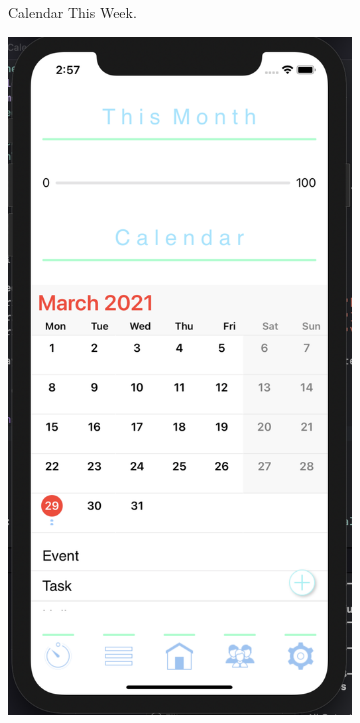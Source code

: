 \begin{figure}[H]
\begin{subfigure}[b]{0.3\textwidth}
        \caption{Calendar This Week.}
        \label{fig:cal_this_week_app}
    \end{subfigure}
    \hfill
    \begin{subfigure}[b]{0.3\textwidth}
        \centering
        \includegraphics[width=\textwidth]{./graphics/Implementation/Dashboard/calendar this month populated.png}

\end{subfigure}
\end{figure}
